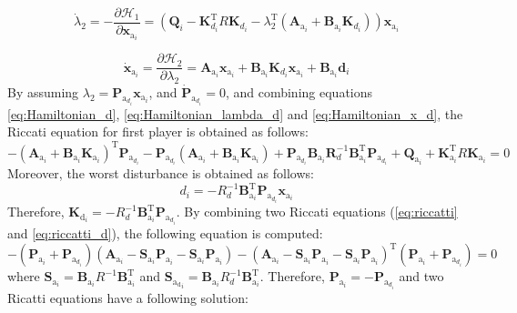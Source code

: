 \documentclass[3p]{elsarticle}
\begin{document}
\begin{equation}\label{eq:Hamiltonian_lambda_d}
    \dot{\lambda}_2 = -\dfrac{\partial \mathcal{H}_1}{\partial \mathbf{x}_{\mathrm{a}_i}} = ( \mathbf{Q}_i - 
    \mathbf{K}_{d_i}^\mathrm{T} R \mathbf{K}_{d_i} -\lambda_2^\mathrm{T}(\mathbf{A}_{\mathrm{a}_i} + \mathbf{B}_{\mathrm{a}_i}\mathbf{K}_{d_i})) \mathbf{x}_{\mathrm{a}_i} 
\end{equation}

\begin{equation}\label{eq:Hamiltonian_x_d}
    \dot{\mathbf{x}}_{\mathrm{a}_i}  = \dfrac{\partial \mathcal{H}_2}{\partial \lambda_2} = \mathbf{A}_{\mathrm{a}_i} \mathbf{x}_{\mathrm{a}_i}  +  \mathbf{B}_{\mathrm{a}_i} \mathbf{K}_{d_i} \mathbf{x}_{\mathrm{a}_i} + \mathbf{B}_{\mathrm{a}_i} \mathbf{d}_i 
\end{equation}
By assuming $\lambda_2 = \mathbf{P}_{\mathrm{a}_{d_i}}\mathbf{x}_{\mathrm{a}_i}$, 
 and $\dot{\mathbf{P}}_{\mathrm{a}_{d_i}} = 0$, and combining equations \eqref{eq:Hamiltonian_d}, \eqref{eq:Hamiltonian_lambda_d} and \eqref{eq:Hamiltonian_x_d}, the Riccati equation for first player is obtained as follows:
 \begin{equation}\label{eq:riccatti_d}
    -( \mathbf{A}_{\mathrm{a}_i} + \mathbf{B}_{\mathrm{a}_i}\mathbf{K}_{\mathrm{a}_i})^\mathrm{T} \mathbf{P}_{\mathrm{a}_{d_i}} - \mathbf{P}_{\mathrm{a}_{d_i}} (\mathbf{A}_{\mathrm{a}_i} + \mathbf{B}_{\mathrm{a}_i}\mathbf{K}_{\mathrm{a}_i}) + \mathbf{P}_{\mathrm{a}_{d_i}} \mathbf{B}_{\mathrm{a}_i} \mathbf{R}_d^{-1} \mathbf{B}_{\mathrm{a}_i}^\mathrm{T} \mathbf{P}_{\mathrm{a}_{d_i}} + \mathbf{Q}_{\mathrm{a}_i}  + \mathbf{K}_{\mathrm{a}_i}^\mathrm{T} R \mathbf{K}_{\mathrm{a}_i} = 0
 \end{equation}
 Moreover, the worst disturbance is obtained as follows:
    \begin{equation}
        d_i = -R_d^{-1}\mathbf{B}_{\mathrm{a}_i}^\mathrm{T}\mathbf{P}_{\mathrm{a}_{d_i}}\mathbf{x}_{\mathrm{a}_i}
    \end{equation}
    Therefore, $\mathbf{K}_{\mathrm{d}_i} = -R_d^{-1}\mathbf{B}_{\mathrm{a}_i}^\mathrm{T}\mathbf{P}_{\mathrm{a}_{d_i}}$.
     By combining two Riccati equations (\eqref{eq:riccatti} and \eqref{eq:riccatti_d}), the following equation is computed:
     \begin{equation}
        -(\mathbf{P}_{\mathrm{a}_{i}} + \mathbf{P}_{\mathrm{a}_{d_i}})\left(
        \mathbf{A}_{\mathrm{a}_i} - \mathbf{S}_{\mathrm{a}_i}\mathbf{P}_{\mathrm{a}_{i}} - \mathbf{S}_{\mathrm{a}_i} \mathbf{P}_{\mathrm{a}_i}
        \right) - \left(
        \mathbf{A}_{\mathrm{a}_i}  - \mathbf{S}_{\mathrm{a}_i}\mathbf{P}_{\mathrm{a}_{i}} - \mathbf{S}_{\mathrm{a}_i} \mathbf{P}_{\mathrm{a}_i}
        \right)^\mathrm{T}(\mathbf{P}_{\mathrm{a}_{i}} + \mathbf{P}_{\mathrm{a}_{d_i}})=0
    \end{equation}
    where $\mathbf{S}_{\mathrm{a}_i} = \mathbf{B}_{\mathrm{a}_i}{R}^{-1}\mathbf{B}_{\mathrm{a}_i}^\mathrm{T}$ and $\mathbf{S}_{\mathrm{a_d}_i} = \mathbf{B}_{\mathrm{a}_i}{R}_d^{-1}\mathbf{B}_{\mathrm{a}_i}^\mathrm{T}$. Therefore, $\mathbf{P}_{\mathrm{a}_i} = -\mathbf{P}_{\mathrm{a}_{d_i}}$ and two Ricatti equations have a following solution:
\end{document}
